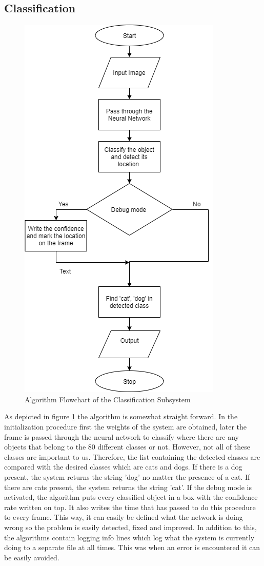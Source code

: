 \subsection{Classification} \label{subsec:classification}

\begin{figure}[h!]
    \centering
    \includegraphics[width=0.4\linewidth]{img/classify_block.png}
    \caption{Algorithm Flowchart of the Classification Subsystem}
    \label{fig:classify_algorithm_flowchart}
\end{figure}

As depicted in figure \ref{fig:classify_algorithm_flowchart} the algorithm is somewhat straight forward. In the initialization procedure first the weights of the system are obtained, later the frame is passed through the neural network to classify where there are any objects that belong to the 80 different classes or not. However, not all of these classes are important to us. Therefore, the list containing the detected classes are compared with the desired classes which are cats and dogs. If there is a dog present, the system returns the string 'dog' no matter the presence of a cat. If there are cats present, the system returns the string 'cat'. If the debug mode is activated, the algorithm puts every classified object in a box with the confidence rate written on top. It also writes the time that has passed to do this procedure to every frame. This way, it can easily be defined what the network is doing wrong so the problem is easily detected, fixed and improved. In addition to this, the algorithms contain logging info lines which log what the system is currently doing to a separate file at all times. This was when an error is encountered it can be easily avoided. 

